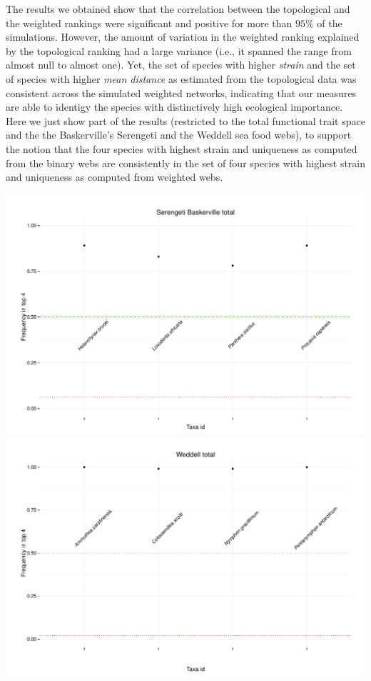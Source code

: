 \documentclass[11pt,article,oneside]{memoir}
\makeatletter
\def\maxwidth{\ifdim\Gin@nat@width>\linewidth\linewidth
\else\Gin@nat@width\fi}
\let\Oldincludegraphics\includegraphics
\renewcommand{\includegraphics}[1]{\Oldincludegraphics[width=\maxwidth]{#1}}
\makeatother
\begin{document}
The results we obtained show that the correlation between the
topological and the weighted rankings were significant and positive for
more than \(95\%\) of the simulations. However, the amount of variation
in the weighted ranking explained by the topological ranking had a large
variance (i.e., it spanned the range from almost null to almost one).
Yet, the set of species with higher \emph{strain} and the set of species
with higher \emph{mean distance} as estimated from the topological data
was consistent across the simulated weighted networks, indicating that
our measures are able to identigy the species with distinctively high
ecological importance. Here we just show part of the results (restricted
to the total functional trait space and the the Baskerville's Serengeti
and the Weddell sea food webs), to support the notion that the four
species with highest strain and uniqueness as computed from the binary
webs are consistently in the set of four species with highest strain and
uniqueness as computed from weighted webs.

\newpage

\includegraphics{Images/strain_weight/Serengeti_Baskerville_total.pdf}
\includegraphics{Images/strain_weight/Weddell_total.pdf}
\end{document}

